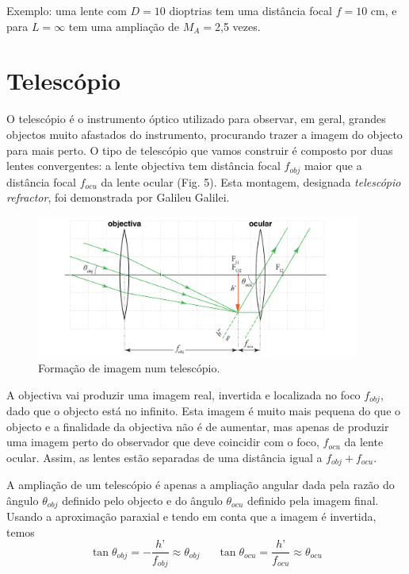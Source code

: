 \documentclass[a4paper,12pt]{article}      %
\begin{document}
Exemplo: uma lente com $D=10$ dioptrias tem uma distância focal $f=10$ cm, e para $L=\infty$ tem uma ampliação de $M_A=$2,5 vezes.


\section {\sf Telescópio}
O telescópio é o instrumento óptico utilizado para observar, em geral, grandes objectos muito afastados do instrumento, procurando trazer a imagem do objecto para mais perto. O tipo de telescópio que vamos construir é composto por duas lentes convergentes: a lente objectiva tem distância focal $f_{obj}$ maior que a distância focal $f_{ocu}$ da lente ocular (Fig. 5). Esta montagem, designada \textit{telescópio refractor}, foi demonstrada por Galileu Galilei.

\begin{figure}
	[!htb]  \centering 
	\includegraphics[width=0.95\textwidth]{telescopio2}
		\caption{Formação de imagem num telescópio. \label{fig:telescopio2}} 
\end{figure}

A objectiva vai produzir uma imagem real, invertida e localizada no foco $f_{obj}$, dado que o objecto está no infinito. Esta imagem é muito mais pequena do que o objecto e a finalidade da objectiva não é de aumentar, mas apenas de produzir uma imagem perto do observador que deve coincidir com o foco, $f_{ocu}$ da lente ocular. Assim, as lentes estão separadas de uma distância igual a $f_{obj} + f_{ocu}$.

A ampliação de um telescópio é apenas a ampliação angular dada pela razão do ângulo $\theta_{obj}$ definido pelo objecto e do ângulo $\theta_{ocu}$ definido pela imagem final. Usando a aproximação paraxial e tendo em conta que a imagem é invertida, temos
\begin{equation}
\tan\theta_{obj}= -\frac{h’}{f_{obj}} \approx \theta_{obj} \,\,\,\,\,\,\,\,\,\tan\theta_{ocu} =\frac{h’}{f_{ocu}}\approx\theta_{ocu}
\end{equation}
\end{document}
